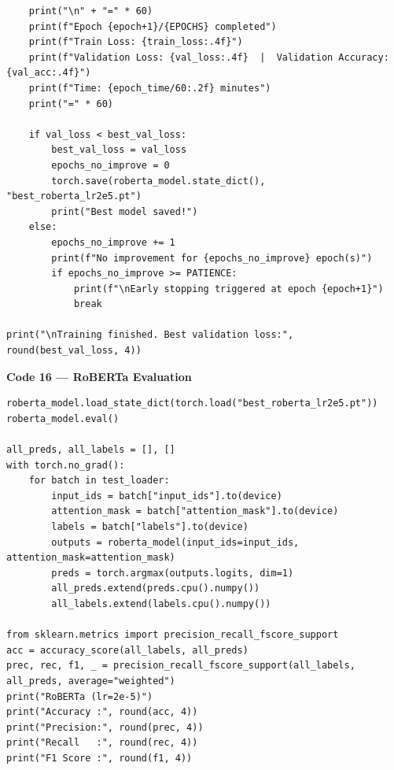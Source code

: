 \documentclass[11pt,a4paper]{article}
\begin{document}
\begin{lstlisting}
    print("\n" + "=" * 60)
    print(f"Epoch {epoch+1}/{EPOCHS} completed")
    print(f"Train Loss: {train_loss:.4f}")
    print(f"Validation Loss: {val_loss:.4f}  |  Validation Accuracy: {val_acc:.4f}")
    print(f"Time: {epoch_time/60:.2f} minutes")
    print("=" * 60)

    if val_loss < best_val_loss:
        best_val_loss = val_loss
        epochs_no_improve = 0
        torch.save(roberta_model.state_dict(), "best_roberta_lr2e5.pt")
        print("Best model saved!")
    else:
        epochs_no_improve += 1
        print(f"No improvement for {epochs_no_improve} epoch(s)")
        if epochs_no_improve >= PATIENCE:
            print(f"\nEarly stopping triggered at epoch {epoch+1}")
            break

print("\nTraining finished. Best validation loss:", round(best_val_loss, 4))
\end{lstlisting}

\noindent\textbf{Code 16 --- RoBERTa Evaluation}
\begin{lstlisting}
roberta_model.load_state_dict(torch.load("best_roberta_lr2e5.pt"))
roberta_model.eval()

all_preds, all_labels = [], []
with torch.no_grad():
    for batch in test_loader:
        input_ids = batch["input_ids"].to(device)
        attention_mask = batch["attention_mask"].to(device)
        labels = batch["labels"].to(device)
        outputs = roberta_model(input_ids=input_ids, attention_mask=attention_mask)
        preds = torch.argmax(outputs.logits, dim=1)
        all_preds.extend(preds.cpu().numpy())
        all_labels.extend(labels.cpu().numpy())

from sklearn.metrics import precision_recall_fscore_support
acc = accuracy_score(all_labels, all_preds)
prec, rec, f1, _ = precision_recall_fscore_support(all_labels, all_preds, average="weighted")
print("RoBERTa (lr=2e-5)")
print("Accuracy :", round(acc, 4))
print("Precision:", round(prec, 4))
print("Recall   :", round(rec, 4))
print("F1 Score :", round(f1, 4))
\end{lstlisting}
\end{document}
